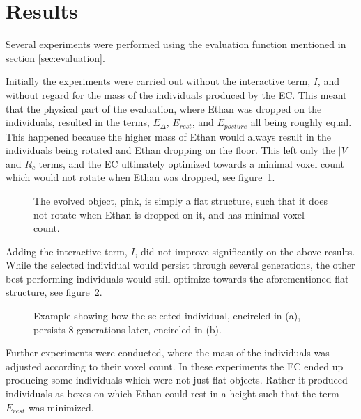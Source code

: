 \section{Results}
Several experiments were performed using the evaluation function mentioned in 
section \ref{sec:evaluation}. 

Initially the experiments were carried out without the interactive term, $I$,
and without regard for the mass of the individuals produced by the EC. This
meant that the physical part of the evaluation, where Ethan was dropped on the
individuals, resulted in the terms, $E_\Delta$, $E_{rest}$, and
$E_{posture}$ all being roughly equal. This happened because the higher mass of
Ethan would always result in the individuals being rotated and Ethan dropping
on the floor. This left only the $|V|$ and $R_c$ terms, and the EC ultimately
optimized towards a minimal voxel count which would not rotate when Ethan was
dropped, see figure~\ref{fig:flat_object}.

\begin{figure}[ht]
\caption{The evolved object, pink, is simply a flat structure, such that it 
does not rotate when Ethan is dropped on it, and has minimal voxel count.}
\label{fig:flat_object}
\end{figure}

Adding the interactive term, $I$, did not improve significantly on the above
results. While the selected individual would persist through several
generations, the other best performing individuals would still optimize towards
the aforementioned flat structure, see figure~\ref{fig:selection}.
\begin{figure}[ht]
\centering
{}
\hfil
{}
\caption{Example showing how the selected individual, encircled in (a), 
persists 8 generations later, encircled in (b).}
\label{fig:selection}
\end{figure}

Further experiments were conducted, where the mass of the individuals was
adjusted according to their voxel count. In these experiments the EC ended up
producing some individuals which were not just flat objects. Rather it 
produced individuals as boxes on which Ethan could rest in a height such that
the term $E_{rest}$ was minimized.